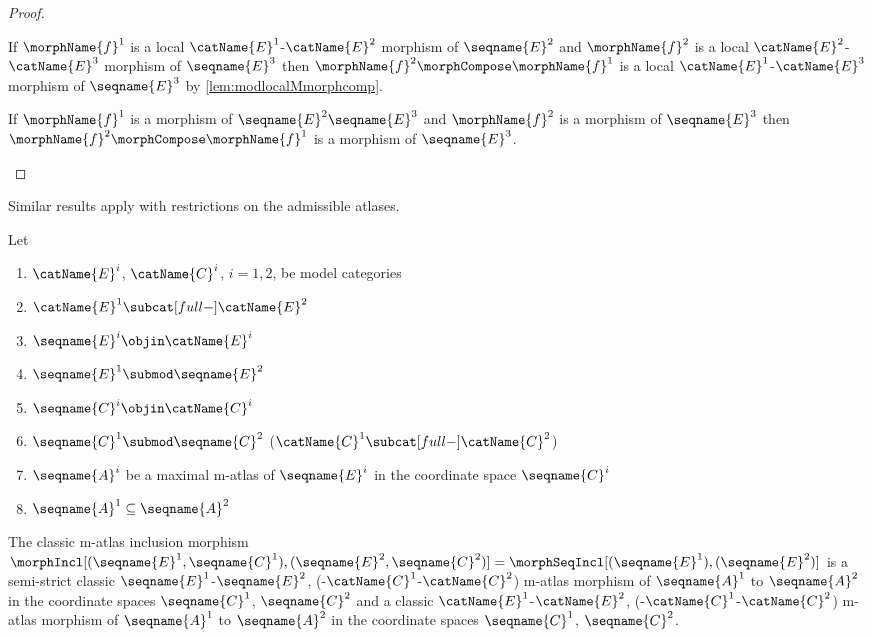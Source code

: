 \documentclass{article}
\begin{document}
\begin{lemma}
\begin{proof}
\begin{description}
If $\morphName{f}^1$ is a local $\catName{E}^1$-$\catName{E}^2$
morphism of $\seqname{E}^2$ and $\morphName{f}^2$ is a local
$\catName{E}^2$-$\catName{E}^3$ morphism of $\seqname{E}^3$ then
$\morphName{f}^2 \morphCompose \morphName{f}^1$ is a local
$\catName{E}^1$-$\catName{E}^3$ morphism of $\seqname{E}^3$ by
\cref{lem:modlocalMmorphcomp}.

If $\morphName{f}^1$ is a morphism of $\seqname{E}^2 \seqname{E}^3$ and
$\morphName{f}^2$ is a morphism of $\seqname{E}^3$ then
$\morphName{f}^2 \morphCompose \morphName{f}^1$ is a morphism of
$\seqname{E}^3$.
\end{description}
\end{proof}
Similar results apply with restrictions on the admissible atlases.
\end{lemma}

\begin{lemma}
\label{lem:M-ATLcid}
Let
\begin{enumerate}
\item
$\catName{E}^i$, $\catName{C}^i$, $i=1,2$, be model categories
\item
$\catName{E}^1 \subcat[full-] \catName{E}^2$
\item
$\seqname{E}^i \objin \catName{E}^i$
\item
$\seqname{E}^1 \submod \seqname{E}^2$
\item
$\seqname{C}^i \objin \catName{C}^i$
\item
$\seqname{C}^1 \submod \seqname{C}^2$
($\catName{C}^1 \subcat[full-] \catName{C}^2$)
\item
$\seqname{A}^i$ be a maximal m-atlas of $\seqname{E}^i$ in the
coordinate space $\seqname{C}^i$
\item
$\seqname{A}^1 \subseteq \seqname{A}^2$
\end{enumerate}

The classic m-atlas inclusion morphism
$
 \morphIncl%
   [
     {(\seqname{E}^1,\seqname{C}^1)},
     {(\seqname{E}^2,\seqname{C}^2)}
   ]
  =
  \morphSeqIncl%
    [
      {(\seqname{E}^1)},
      {(\seqname{E}^2)}
    ]
$
is a semi-strict classic
\nobreaks
  {
    {$\seqname{E}^1$-$\seqname{E}^2$},
    {(-$\catName{C}^1$-$\catName{C}^2$)}
  }
m-atlas morphism of $\seqname{A}^1$ to $\seqname{A}^2$ in the coordinate
spaces $\seqname{C}^1$, $\seqname{C}^2$ and a classic
\nobreaks
  {
    {$\catName{E}^1$-$\catName{E}^2$},
    {(-$\catName{C}^1$-$\catName{C}^2$)}
  }
m-atlas morphism of $\seqname{A}^1$ to $\seqname{A}^2$ in the coordinate
spaces $\seqname{C}^1$, $\seqname{C}^2$.


\end{lemma}
\end{document}
